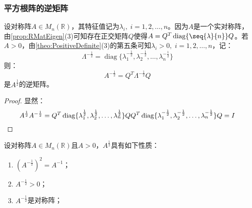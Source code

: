 \subsubsection{平方根阵的逆矩阵}
\begin{theorem}
	设对称阵$A\in M_n(\mathbb{R})$，其特征值记为$\lambda_i,\;i=1,2,\dots,n$。因为$A$是一个实对称阵，由\cref{prop:RMatEigen}(3)可知存在正交矩阵$Q$使得$A=Q^T\operatorname{diag}\{\seq{\lambda}{n}\}Q$。若$A>0$，由\cref{theo:PositiveDefinite}(3)的第五条可知$\lambda_i>0,\;i=1,2,\dots,n$，记：
	\begin{equation*}
		\varLambda^{-\frac{1}{2}}=\operatorname{diag}\{\lambda_1^{-\frac{1}{2}},\lambda_2^{-\frac{1}{2}},\dots,\lambda_n^{-\frac{1}{2}}\}
	\end{equation*}
	则：
	\begin{equation*}
		A^{-\frac{1}{2}}=Q^T\varLambda^{-\frac{1}{2}} Q
	\end{equation*}
	是$A^{\frac{1}{2}}$的逆矩阵。
\end{theorem}
\begin{proof}
	显然：
	\begin{equation*}
		A^{\frac{1}{2}}A^{-\frac{1}{2}}=Q^T\operatorname{diag}\{\lambda_1^{\frac{1}{2}},\lambda_2^{\frac{1}{2}},\dots,\lambda_n^{\frac{1}{2}}\}QQ^T\operatorname{diag}\{\lambda_1^{-\frac{1}{2}},\lambda_2^{-\frac{1}{2}},\dots,\lambda_n^{-\frac{1}{2}}\}Q=I\qedhere
	\end{equation*}
\end{proof}
\begin{property}\label{prop:ReverseSquareRootMat}
	设对称阵$A\in M_n(\mathbb{R})$且$A>0$，$A^{\frac{1}{2}}$具有如下性质：
	\begin{enumerate}
		\item $(A^{-\frac{1}{2}})^2=A^{-1}$；
		\item $A^{-\frac{1}{2}}>0$；
		\item $A^{-\frac{1}{2}}$是对称阵；
	\end{enumerate}
\end{property}

